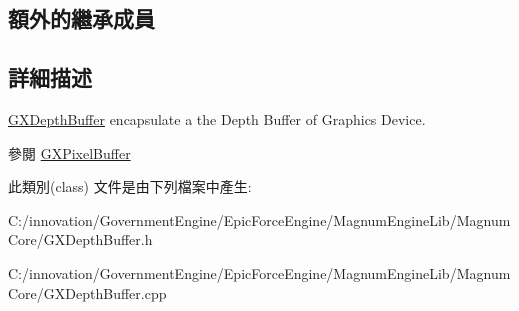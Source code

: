 \subsection*{額外的繼承成員}


\subsection{詳細描述}
\hyperlink{class_i_dream_sky_1_1_g_x_depth_buffer}{G\+X\+Depth\+Buffer} encapsulate a the Depth Buffer of Graphics Device. 

\begin{DoxySeeAlso}{參閱}
\hyperlink{class_i_dream_sky_1_1_g_x_pixel_buffer}{G\+X\+Pixel\+Buffer} 
\end{DoxySeeAlso}


此類別(class) 文件是由下列檔案中產生\+:\begin{DoxyCompactItemize}
\item 
C\+:/innovation/\+Government\+Engine/\+Epic\+Force\+Engine/\+Magnum\+Engine\+Lib/\+Magnum\+Core/G\+X\+Depth\+Buffer.\+h\item 
C\+:/innovation/\+Government\+Engine/\+Epic\+Force\+Engine/\+Magnum\+Engine\+Lib/\+Magnum\+Core/G\+X\+Depth\+Buffer.\+cpp\end{DoxyCompactItemize}
